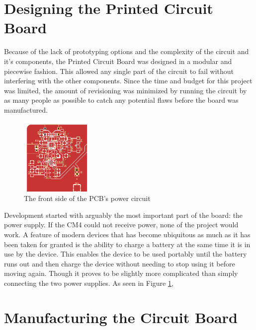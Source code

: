 \section{Designing the Printed Circuit Board}\label{sec:DesigningThePCB}

Because of the lack of prototyping options and the complexity of the circuit and it's components, the Printed Circuit Board was designed in a modular and piecewise fashion.
This allowed any single part of the circuit to fail without interfering with the other components.
Since the time and budget for this project was limited, the amount of revisioning was minimized by running the circuit by as many people as possible to catch any potential flaws before the board was manufactured.

\begin{figure}
  \centering
  \includegraphics[width=0.3\textwidth]{Figures/kicad/close-ups/power-front}
  \caption[PCB Power Circuit]{The front side of the PCB's power circuit}
  \label{fig:PowerCircuit}
\end{figure}
Development started with arguably the most important part of the board: the power supply.
If the CM4 could not receive power, none of the project would work.
A feature of modern devices that has become ubiquitous as much as it has been taken for granted is the ability to charge a battery at the same time it is in use by the device.
This enables the device to be used portably until the battery runs out and then charge the device without needing to stop using it before moving again.
Though it proves to be slightly more complicated than simply connecting the two power supplies.
As seen in Figure \ref{fig:PowerCircuit},


\section{Manufacturing the Circuit Board}\label{sec:ManufacturingThePCB}

\todosection